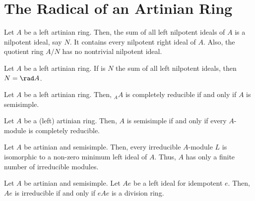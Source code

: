 \documentclass[11pt,leqno,oneside]{amsbook}
\numberwithin{thm}{section}
\begin{document}
\section{The Radical of an Artinian Ring}
\begin{thm}
  Let \(A\) be a left artinian ring. Then, the sum of all left nilpotent
  ideals of \(A\) is a nilpotent ideal, say \(N\). It contains every
  nilpotent right ideal of \(A\). Also, the quotient ring \(A/N\) has
  no nontrivial nilpotent ideal.
\end{thm}
\begin{thm}
  Let \(A\) be a left artinian ring. If is \(N\) the sum of all
  left nilpotent ideals, then \(N = \rad A\).
\end{thm}
\begin{thm}
  Let \(A\) be a left artinian ring. Then, \({}_A A\) is completely
  reducible if and only if \(A\) is semisimple.
\end{thm}
\begin{thm}
  Let \(A\) be a (left) artinian ring. Then, \(A\) is semisimple if
  and only if every \(A\)-module is completely reducible.
\end{thm}
\begin{thm}
  Let \(A\) be artinian and semisimple. Then, every irreducible
  \(A\)-module \(L\) is isomorphic to a non-zero minimum left ideal of
  \(A\). Thus, \(A\) has only a finite number of irreducible modules.
\end{thm}
\begin{thm}
  Let \(A\) be artinian and semisimple. Let \(Ae\) be a left ideal for
  idempotent \(e\). Then, \(Ae\) is irreducible if and only if \(eAe\)
  is a division ring.
\end{thm}
\end{document}
